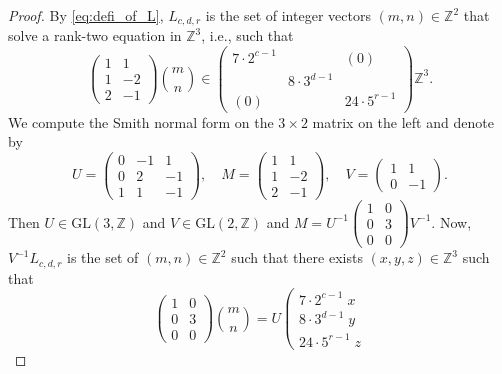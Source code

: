 \documentclass[10pt,a4paper]{amsart}
\newcommand{\GL}{\rm{GL}}
\newcommand{\Z}{\bb Z}
\newcommand{\bb}[1]{\mathbb{#1}}
\renewcommand{\rm}[1]{\mathrm{#1}}
\begin{document}
	\begin{proof}
		By \cref{eq:defi_of_L}, $L_{c,d,r}$ is the set of integer vectors $(m,n) \in \Z^2$ that solve a rank-two equation in $\Z^3$, i.e., such that 
		$$ 
		\left(\begin{array}{rr}
			1 & 1 \\
			1 & -2 \\
			2 & -1
		\end{array}\right)
		\binom{m}{n} \in 
		\left(\begin{array}{ccc}
			7 \cdot 2^{c-1} & & (0) \\
			& 8 \cdot 3^{d-1} & \\
			(0) & & 24 \cdot 5^{r-1}
		\end{array}\right) \Z^3 .$$
		We compute the Smith normal form on the $3 \times 2$ matrix on the left and denote by 
		$$ 
		U = \left( 
		\begin{array}{rrr}
			0 &  -1 & 1\\
			0 & 2 &  -1\\
			1 & 1 &  -1
		\end{array}\right) , \quad
		M = 
		\left(
		\begin{array}{rr}
			1 & 1 \\
			1 & -2 \\
			2 & -1 
		\end{array}\right), \quad
		V = \left( 
		\begin{array}{rr}
			1 & 1\\
			0 & -1  
		\end{array}\right).
		$$ 
		Then $U \in \GL(3,\Z)$ and $V \in \GL(2,\Z)$ and
		$     M = U^{-1} \left(
		\begin{array}{rr}
			1 & 0 \\
			0 & 3 \\
			0 & 0
		\end{array} \right) V^{-1}.
		$
		Now, $V^{-1} L_{c,d,r}$ is the set of $(m,n)\in \Z^2$ such that there exists $(x,y,z) \in \Z^3$ such that
		\begin{equation}\label{eq:nicer-Lcde}
			\left(
			\begin{array}{rr}
				1 & 0 \\
				0 & 3 \\
				0 & 0
			\end{array} \right) 
			\binom{m}{n} =
			U  \left(\begin{array}{r}
				7 \cdot 2^{c-1} \; x  \\
				8 \cdot 3^{d-1} \; y \\
				24 \cdot 5^{r-1}\; z

\end{array}
\end{equation}
\end{proof}
\end{document}
